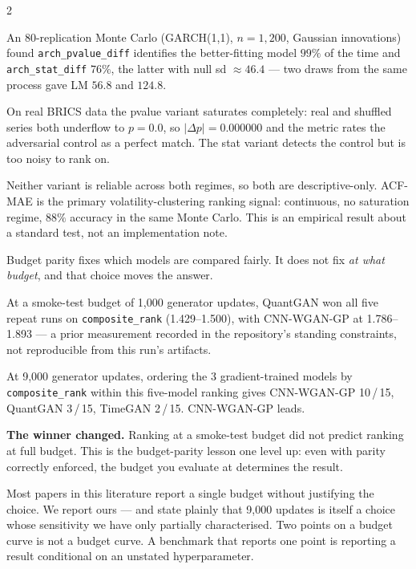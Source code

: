 \documentclass[10pt]{article}
\newcommand{\amberbox}[2]{\begin{tcolorbox}[mybox={Amber}{ABg},title={#1}]#2\end{tcolorbox}}
\newcommand{\redbox}[2]{\begin{tcolorbox}[mybox={DRed}{RBg},title={#1}]#2\end{tcolorbox}}
\begin{document}
\begin{multicols}{2}
\columnbreak

\amberbox{ARCH-LM: A Regime Failure, Reported as a Result}{%
An 80-replication Monte Carlo (GARCH(1,1), $n=1{,}200$, Gaussian innovations) found \texttt{arch\_pvalue\_diff} identifies the better-fitting model $99\%$ of the time and \texttt{arch\_stat\_diff} $76\%$, the latter with null sd $\approx46.4$ --- two draws from the same process gave LM $56.8$ and $124.8$.

\smallskip
On real BRICS data the pvalue variant saturates completely: real and shuffled series both underflow to $p=0.0$, so $|\Delta p| = 0.000000$ and the metric rates the adversarial control as a perfect match. The stat variant detects the control but is too noisy to rank on.

\smallskip
Neither variant is reliable across both regimes, so both are descriptive-only. ACF-MAE is the primary volatility-clustering ranking signal: continuous, no saturation regime, $88\%$ accuracy in the same Monte Carlo. This is an empirical result about a standard test, not an implementation note.}

\redbox{What the Budget Choice Cost}{%
Budget parity fixes which models are compared fairly. It does not fix \emph{at what budget}, and that choice moves the answer.

\smallskip
At a smoke-test budget of 1{,}000 generator updates, QuantGAN won all five repeat runs on \texttt{composite\_rank} (1.429--1.500), with CNN-WGAN-GP at 1.786--1.893 --- a prior measurement recorded in the repository's standing constraints, not reproducible from this run's artifacts.

\smallskip
At 9,000 generator updates, ordering the 3 gradient-trained models by \texttt{composite\_rank} within this five-model ranking gives CNN-WGAN-GP 10\,/\,15, QuantGAN 3\,/\,15, TimeGAN 2\,/\,15. CNN-WGAN-GP leads.

\smallskip
\textbf{The winner changed.} Ranking at a smoke-test budget did not predict ranking at full budget. This is the budget-parity lesson one level up: even with parity correctly enforced, the budget you evaluate at determines the result.

\smallskip
Most papers in this literature report a single budget without justifying the choice. We report ours --- and state plainly that 9,000 updates is itself a choice whose sensitivity we have only partially characterised. Two points on a budget curve is not a budget curve. A benchmark that reports one point is reporting a result conditional on an unstated hyperparameter.}


\end{multicols}
\end{document}
